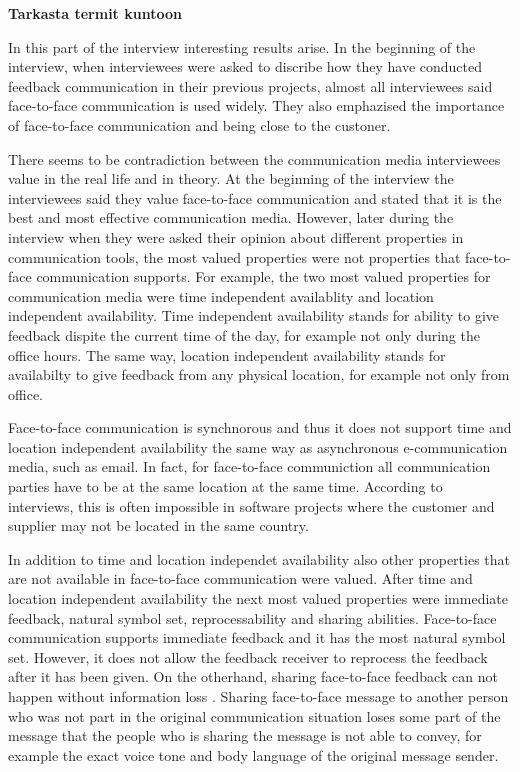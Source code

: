 \documentclass[english,12pt,a4paper,pdftex]{article}
\begin{document}
\textbf{Tarkasta termit kuntoon}

In this part of the interview interesting results arise. In the beginning of the interview, when interviewees were asked to discribe how they have conducted feedback communication in their previous projects, almost all interviewees said face-to-face communication is used widely. They also emphazised the importance of face-to-face communication and being close to the custoner. 

There seems to be contradiction between the communication media interviewees value in the real life and in theory. At the beginning of the interview the interviewees said they value face-to-face communication and stated that it is the best and most effective communication media. However, later during the interview when they were asked their opinion about different properties in communication tools, the most valued properties were not properties that face-to-face communication supports. For example, the two most valued properties for communication media were time independent availablity and location independent availability. Time independent availability stands for ability to give feedback dispite the current time of the day, for example not only during the office hours. The same way, location independent availability stands for availabilty to give feedback from any physical location, for example not only from office.

Face-to-face communication is synchnorous and thus it does not support time and location independent availability the same way as asynchronous e-communication media, such as email. In fact, for face-to-face communiction all communication parties have to be at the same location at the same time. According to interviews, this is often impossible in software projects where the customer and supplier may not be located in the same country.

In addition to time and location independet availability also other properties that are not available in face-to-face communication were valued. After time and location independent availability the next most valued properties were immediate feedback, natural symbol set, reprocessability and sharing abilities. Face-to-face communication supports immediate feedback and it has the most natural symbol set. However, it does not allow the feedback receiver to reprocess the feedback after it has been given. On the otherhand, sharing face-to-face feedback can not happen without information loss \citep{higa2007}. Sharing face-to-face message to another person who was not part in the original communication situation loses some part of the message that the people who is sharing the message is not able to convey, for example the exact voice tone and body language of the original message sender.
\end{document}
